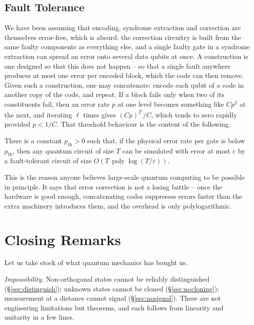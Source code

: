 \documentclass[a4paper]{scrartcl}
\DeclareMathOperator{\poly}{poly}
\begin{document}
\subsection{Fault Tolerance}

We have been assuming that encoding, syndrome extraction and correction are themselves error-free, which is absurd: the correction circuitry is built from the same faulty components as everything else, and a single faulty gate in a syndrome extraction can spread an error onto several data qubits at once. A  construction is one designed so that this does not happen -- so that a single fault anywhere produces at most one error per encoded block, which the code can then remove. Given such a construction, one may concatenate: encode each qubit of a code in another copy of the code, and repeat. If a block fails only when two of its constituents fail, then an error rate $p$ at one level becomes something like $Cp^2$ at the next, and iterating $\ell$ times gives $(Cp)^{2^\ell}/C$, which tends to zero rapidly provided $p<1/C$. That threshold behaviour is the content of the following.

\begin{theorem}
	There is a constant $p_{\mathrm{th}}>0$ such that, if the physical error rate per gate is below $p_{\mathrm{th}}$, then any quantum circuit of size $T$ can be simulated with error at most $\varepsilon$ by a fault-tolerant circuit of size $O\left(T\,\poly\log(T/\varepsilon)\right)$.
\end{theorem}

This is the reason anyone believes large-scale quantum computing to be possible in principle. It says that error correction is not a losing battle -- once the hardware is good enough, concatenating codes suppresses errors faster than the extra machinery introduces them, and the overhead is only polylogarithmic.

\section{Closing Remarks}

Let us take stock of what quantum mechanics has bought us.

\emph{Impossibility.} Non-orthogonal states cannot be reliably distinguished (\S\ref{sec:distinguish}); unknown states cannot be cloned (\S\ref{sec:nocloning}); measurement at a distance cannot signal (\S\ref{sec:nosignal}). These are not engineering limitations but theorems, and each follows from linearity and unitarity in a few lines.
\end{document}
